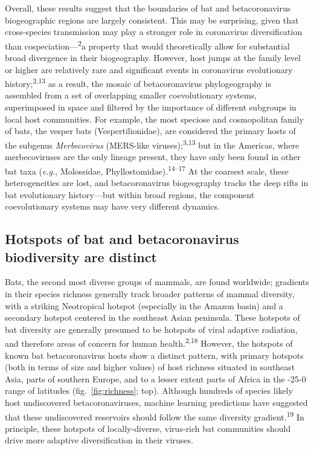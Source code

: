 \documentclass[11pt]{article}
\begin{document}
Overall, these results suggest that the boundaries of bat and
betacoronavirus biogeographic regions are largely consistent. This may
be surprising, given that cross-species transmission may play a stronger
role in coronavirus diversification than
cospeciation---\textsuperscript{2}a property that would theoretically
allow for substantial broad divergence in their biogeography. However,
host jumps at the family level or higher are relatively rare and
significant events in coronavirus evolutionary
history;\textsuperscript{2,13} as a result, the mosaic of
betacoronavirus phylogeography is assembled from a set of overlapping
smaller coevolutionary systems, superimposed in space and filtered by
the importance of different subgroups in local host communities. For
example, the most speciose and cosmopolitan family of bats, the vesper
bats (Vespertilionidae), are considered the primary hosts of the
subgenus \emph{Merbecovirus} (MERS-like viruses);\textsuperscript{3,13}
but in the Americas, where merbecoviruses are the only lineage present,
they have only been found in other bat taxa (\emph{e.g.}, Molossidae,
Phyllostomidae).\textsuperscript{14--17} At the coarsest scale, these
heterogeneities are lost, and betacoronavirus biogeography tracks the
deep rifts in bat evolutionary history---but within broad regions, the
component coevolutionary systems may have very different dynamics.

\hypertarget{hotspots-of-bat-and-betacoronavirus-biodiversity-are-distinct}{%
\subsection{Hotspots of bat and betacoronavirus biodiversity are
distinct}\label{hotspots-of-bat-and-betacoronavirus-biodiversity-are-distinct}}

Bats, the second most diverse groups of mammals, are found worldwide;
gradients in their species richness generally track broader patterns of
mammal diversity, with a striking Neotropical hotspot (especially in the
Amazon basin) and a secondary hotspot centered in the southeast Asian
peninsula. These hotspots of bat diversity are generally presumed to be
hotspots of viral adaptive radiation, and therefore areas of concern for
human health.\textsuperscript{2,18} However, the hotspots of known bat
betacoronavirus hosts show a distinct pattern, with primary hotspots
(both in terms of size and higher values) of host richness situated in
southeast Asia, parts of southern Europe, and to a lesser extent parts
of Africa in the -25-0 range of latitudes (fig.~\ref{fig:richness};
top). Although hundreds of species likely host undiscovered
betacoronaviruses, machine learning predictions have suggested that
these undiscovered reservoirs should follow the same diversity
gradient.\textsuperscript{19} In principle, these hotspots of
locally-diverse, virus-rich bat communities should drive more adaptive
diversification in their viruses.
\end{document}
